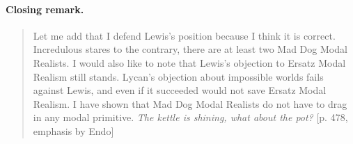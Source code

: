 \documentclass[
10pt, %
a4paper, %
twocolumn, %
landscape %
]{article}
\begin{document}
\paragraph{Closing remark.}
\begin{quotation}
  Let me add that I defend Lewis's position because I think it is correct. Incredulous stares to the contrary, there are at least two Mad Dog Modal Realists. I would also like to note that Lewis's objection to Ersatz Modal Realism still stands. Lycan's objection about impossible worlds fails against Lewis, and even if it succeeded would not save Ersatz Modal Realism. I have shown that Mad Dog Modal Realists do not have to drag in any modal primitive. \emph{The kettle is shining, what about the pot?} [p. 478, emphasis by Endo]
\end{quotation}




\end{document}
